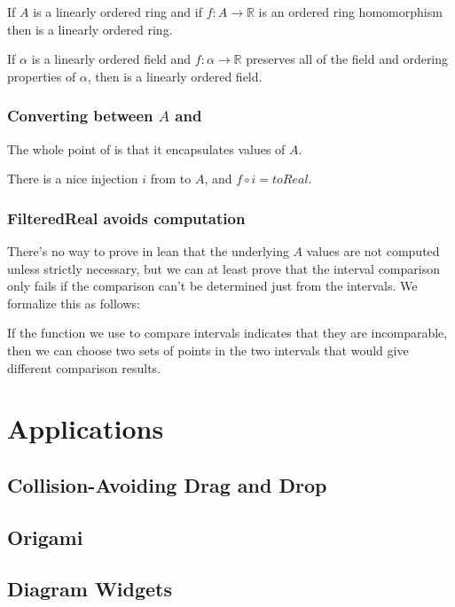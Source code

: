 \begin{lemma}
  \label{thm:filteredOrderedRing}
  If $A$ is a linearly ordered ring and if $f : A → ℝ$ is an ordered ring homomorphism then
   is a linearly ordered ring.
\end{lemma}

\begin{theorem}
  \label{thm:filteredOrderedField}
  If $α$ is a linearly ordered field and $f : α → ℝ$ preserves all of the field
  and ordering properties of $α$, then  is a linearly
  ordered field.
\end{theorem}

\subsection{Converting between $A$ and }

The whole point of  is that it encapsulates values of
$A$.

\begin{definition}
  \label{def:filteredEquivalent}
  \notready
  There is a nice injection $i$ from  to
  $A$, and $f \circ i = toReal$.
\end{definition}

\subsection{FilteredReal avoids computation}

There's no way to prove in lean that the underlying $A$ values are not computed
unless strictly necessary, but we can at least prove that the interval
comparison only fails if the comparison can't be determined just from the
intervals. We formalize this as follows:

\begin{lemma}
  \label{thm:compareComplete}
  \leanok
  If the function we use to compare intervals indicates that they are
  incomparable, then we can choose two sets of points in the two intervals that
  would give different comparison results.
\end{lemma}

\chapter{Applications}

\section{Collision-Avoiding Drag and Drop}

\section{Origami}

\section{Diagram Widgets}


